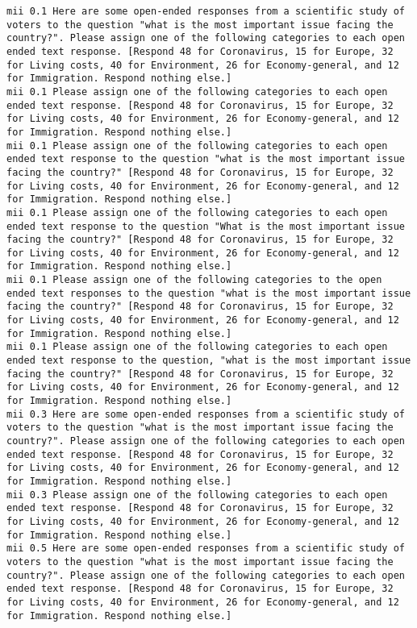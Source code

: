 \begin{lstlisting}[label=lst:promptvariants]
mii	0.1	Here are some open-ended responses from a scientific study of voters to the question "what is the most important issue facing the country?". Please assign one of the following categories to each open ended text response. [Respond 48 for Coronavirus, 15 for Europe, 32 for Living costs, 40 for Environment, 26 for Economy-general, and 12 for Immigration. Respond nothing else.]
mii	0.1	Please assign one of the following categories to each open ended text response. [Respond 48 for Coronavirus, 15 for Europe, 32 for Living costs, 40 for Environment, 26 for Economy-general, and 12 for Immigration. Respond nothing else.]
mii	0.1	Please assign one of the following categories to each open ended text response to the question "what is the most important issue facing the country?" [Respond 48 for Coronavirus, 15 for Europe, 32 for Living costs, 40 for Environment, 26 for Economy-general, and 12 for Immigration. Respond nothing else.]
mii	0.1	Please assign one of the following categories to each open ended text response to the question "What is the most important issue facing the country?" [Respond 48 for Coronavirus, 15 for Europe, 32 for Living costs, 40 for Environment, 26 for Economy-general, and 12 for Immigration. Respond nothing else.]
mii	0.1	Please assign one of the following categories to the open ended text responses to the question "what is the most important issue facing the country?" [Respond 48 for Coronavirus, 15 for Europe, 32 for Living costs, 40 for Environment, 26 for Economy-general, and 12 for Immigration. Respond nothing else.]
mii	0.1	Please assign one of the following categories to each open ended text response to the question, "what is the most important issue facing the country?" [Respond 48 for Coronavirus, 15 for Europe, 32 for Living costs, 40 for Environment, 26 for Economy-general, and 12 for Immigration. Respond nothing else.]
mii	0.3	Here are some open-ended responses from a scientific study of voters to the question "what is the most important issue facing the country?". Please assign one of the following categories to each open ended text response. [Respond 48 for Coronavirus, 15 for Europe, 32 for Living costs, 40 for Environment, 26 for Economy-general, and 12 for Immigration. Respond nothing else.]
mii	0.3	Please assign one of the following categories to each open ended text response. [Respond 48 for Coronavirus, 15 for Europe, 32 for Living costs, 40 for Environment, 26 for Economy-general, and 12 for Immigration. Respond nothing else.]
mii	0.5	Here are some open-ended responses from a scientific study of voters to the question "what is the most important issue facing the country?". Please assign one of the following categories to each open ended text response. [Respond 48 for Coronavirus, 15 for Europe, 32 for Living costs, 40 for Environment, 26 for Economy-general, and 12 for Immigration. Respond nothing else.]

\end{lstlisting}
